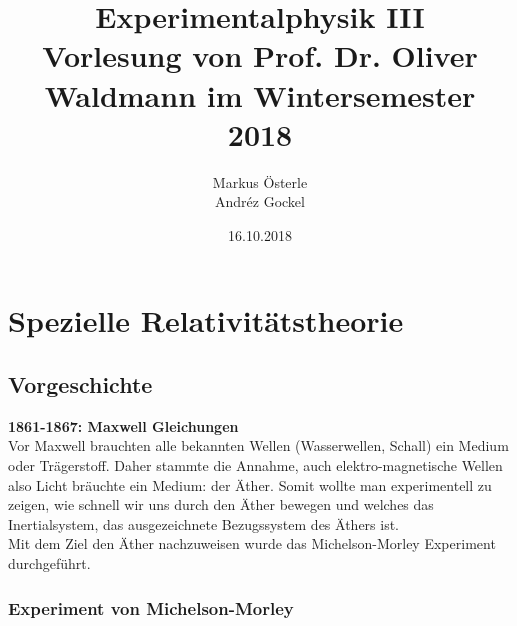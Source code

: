 \documentclass[titlepage,11pt,a4paper,ngerman]{report}
\begin{document}
	
\renewcommand{\thechapter}{\Roman{chapter}}

\title{
	{\Huge Experimentalphysik III}\\[1em]
	{\Large Vorlesung von Prof. Dr. Oliver Waldmann im Wintersemester 2018}}
\author{Markus Österle\\ Andréz Gockel}
\date{16.10.2018}
\maketitle
\tableofcontents



\chapter{Spezielle Relativitätstheorie}

\section{Vorgeschichte}

\textbf{1861-1867: Maxwell Gleichungen}\\
Vor Maxwell brauchten alle bekannten Wellen (Wasserwellen, Schall) ein Medium oder Trägerstoff. Daher stammte die Annahme, auch elektro-magnetische Wellen also Licht bräuchte ein Medium: der Äther. Somit wollte man experimentell zu zeigen, wie schnell wir uns durch den Äther bewegen und welches das Inertialsystem, das ausgezeichnete Bezugssystem des Äthers ist.\\
Mit dem Ziel den Äther nachzuweisen wurde das Michelson-Morley Experiment durchgeführt.

\subsection{Experiment von Michelson-Morley}%
\end{document}
